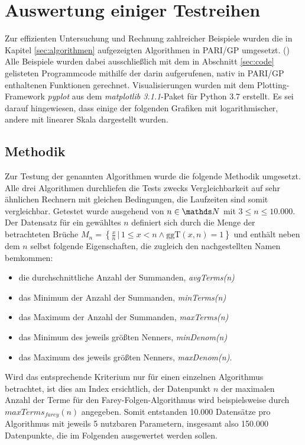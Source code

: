 \section{Auswertung einiger Testreihen}\label{sec:Testreihen}
Zur effizienten Untersuchung und Rechnung zahlreicher Beispiele wurden die in Kapitel \ref{sec:algorithmen} aufgezeigten Algorithmen in PARI/GP umgesetzt. (\cite{PARI2018})\\
Alle Beispiele wurden dabei ausschließlich mit dem in Abschnitt \ref{sec:code} gelisteten Programmcode \bzw mithilfe der darin aufgerufenen, nativ in PARI/GP enthaltenen Funktionen gerechnet.
Visualisierungen wurden mit dem Plotting-Framework \emph{pyplot} aus dem \emph{matplotlib 3.1.1}-Paket für Python 3.7 erstellt. Es sei darauf hingewiesen, dass einige der folgenden Grafiken mit logarithmischer, andere mit linearer Skala dargestellt wurden.

\subsection{Methodik}
Zur Testung der genannten Algorithmen wurde die folgende Methodik umgesetzt.
Alle drei Algorithmen durchliefen die Tests zwecks Vergleichbarkeit auf sehr ähnlichen Rechnern mit gleichen Bedingungen, die Laufzeiten sind somit vergleichbar.
Getestet wurde ausgehend von $n \in \N$ mit $3 \leq n \leq 10.000$.
Der Datensatz für ein gewähltes $n$ definiert sich durch die Menge der betrachteten Brüche $M_n = \left\{ \frac{x}{n} \, | \, 1\leq x < n \wedge \text{ggT}(x,n) = 1\right\}$ und enthält neben dem $n$ selbst folgende Eigenschaften, die zugleich den nachgestellten Namen bemkommen:
\begin{itemize}
	\item die durchschnittliche Anzahl der Summanden, \emph{avgTerms(n)}
	\item das Minimum der Anzahl der Summanden, \emph{minTerms(n)}
	\item das Maximum der Anzahl der Summanden, \emph{maxTerms(n)}
	\item das Minimum des jeweils größten Nenners, \emph{minDenom(n)}
	\item das Maximum des jeweils größten Nenners, \emph{maxDenom(n)}.
\end{itemize}
Wird das entsprechende Kriterium nur für einen einzelnen Algorithmus betrachtet, ist dies am Index ersichtlich, der Datenpunkt $n$ der maximalen Anzahl der Terme für den Farey-Folgen-Algorithmus wird beispielsweise durch $maxTerms_{farey}(n)$ angegeben.
Somit entstanden 10.000 Datensätze pro Algorithmus mit jeweils 5 nutzbaren Parametern, insgesamt also 150.000 Datenpunkte, die im Folgenden ausgewertet werden sollen.

